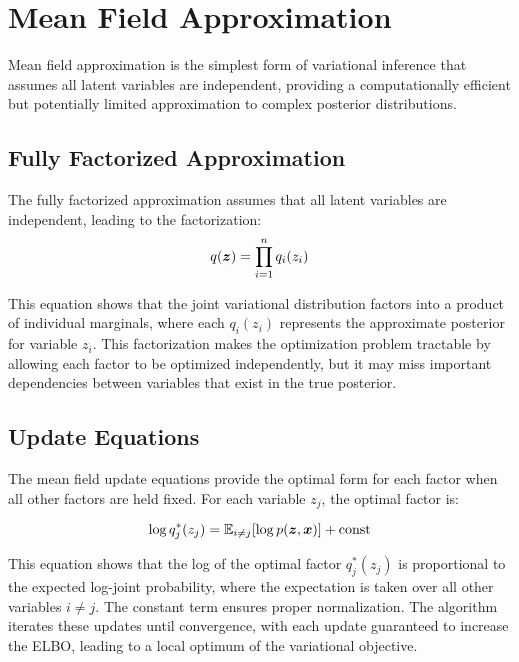 
\section{Mean Field Approximation }
\label{sec:mean-field}

Mean field approximation is the simplest form of variational inference that assumes all latent variables are independent, providing a computationally efficient but potentially limited approximation to complex posterior distributions.

\subsection{Fully Factorized Approximation}

The fully factorized approximation assumes that all latent variables are independent, leading to the factorization:
\begin{equation}
q(\boldsymbol{z}) = \prod_{i=1}^{n} q_i(z_i)
\end{equation}

This equation shows that the joint variational distribution factors into a product of individual marginals, where each $q_i(z_i)$ represents the approximate posterior for variable $z_i$. This factorization makes the optimization problem tractable by allowing each factor to be optimized independently, but it may miss important dependencies between variables that exist in the true posterior.

\subsection{Update Equations}

The mean field update equations provide the optimal form for each factor when all other factors are held fixed. For each variable $z_j$, the optimal factor is:

\begin{equation}
\log q_j^*(z_j) = \mathbb{E}_{i \neq j}[\log p(\boldsymbol{z}, \boldsymbol{x})] + \text{const}
\end{equation}

This equation shows that the log of the optimal factor $q_j^*(z_j)$ is proportional to the expected log-joint probability, where the expectation is taken over all other variables $i \neq j$. The constant term ensures proper normalization. The algorithm iterates these updates until convergence, with each update guaranteed to increase the ELBO, leading to a local optimum of the variational objective.

